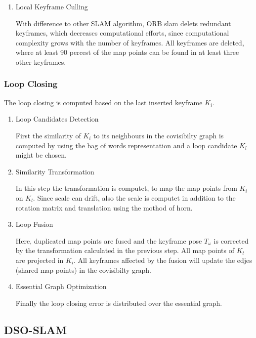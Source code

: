 \begin{enumerate}
	\item{Local Keyframe Culling}
	
	With difference to other SLAM algorithm, ORB slam delets redundant 
	keyframes, which decreases computational efforts, since computational
	complexity grows with the number of keyframes. All keyframes are deleted, 
	where at least 90 percest of the map points can be found in at least three other 
	keyframes. 
	
	
	\end{enumerate}
	
	\subsubsection{Loop Closing}
	
	The loop closing is computed based on the last inserted keyframe $K_i$. 
	
	\begin{enumerate}
	\item{Loop Candidates Detection}
	
	First the similarity of $K_i$ to its neighbours in the covisibilty
	graph is computed by using the bag of words representation and a 
	loop candidate $K_l$ might be chosen. 
	
	\item{Similarity Transformation}
	
	In this step the transformation is computet, to map the map points
	from $K_i$ on $K_l$. Since scale can drift, also the scale is computet
	in addition to the rotation matrix and translation using the mothod of horn. 
	
	
	\item{Loop Fusion}
	
	Here, duplicated map points are fused and the keyframe pose $T_\omega$ is corrected by the transformation
	calculated in the previous step. All map points of $K_l$ are projected in $K_i$. 
	All keyframes affected by the fusion will update the edjes (shared map points) in the 
	covisibilty graph. 
	
	\item{ Essential Graph Optimization}
	
	Finally the loop closing error is distributed over the essential graph. 
	
	
	\end{enumerate}

	\subsection{DSO-SLAM}
	
